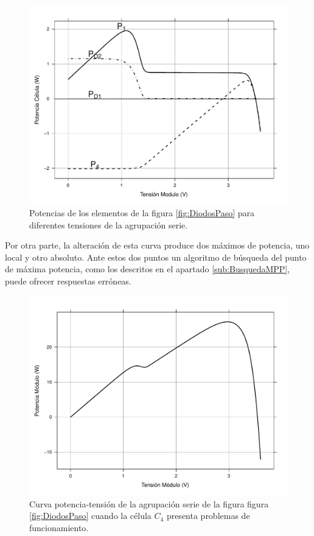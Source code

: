 \begin{figure}
\begin{centering}
\includegraphics[scale=0.5]{../figs/PotenciaCelulas_DiodoPaso}
\end{centering}

\caption{Potencias de los elementos de la figura \ref{fig:DiodosPaso} para
diferentes tensiones de la agrupación serie.\label{fig:PotenciaDiodosPaso}}

\end{figure}


Por otra parte, la alteración de esta curva produce dos máximos de
potencia, uno local y otro absoluto. Ante estos dos puntos un algoritmo
de búsqueda del punto de máxima potencia, como los descritos en el
apartado \ref{sub:BusquedaMPP}, puede ofrecer respuestas erróneas.


\begin{figure}
\begin{centering}
\includegraphics[scale=0.5]{../figs/PotenciaModulo}
\end{centering}

\caption{Curva potencia-tensión de la agrupación serie de la figura figura
\ref{fig:DiodosPaso} cuando la célula $C_{4}$ presenta problemas
de funcionamiento.\label{fig:PotenciaTensionSerieDiodosPaso} }

\end{figure}

